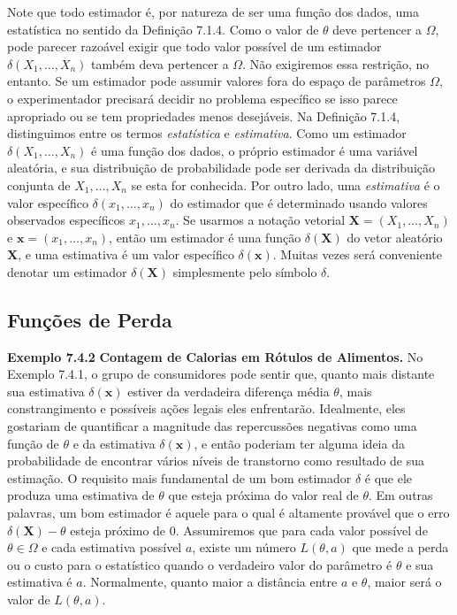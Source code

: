 \vspace{1cm}
Note que todo estimador é, por natureza de ser uma função dos dados, uma estatística no sentido da Definição 7.1.4.
Como o valor de $\theta$ deve pertencer a $\Omega$, pode parecer razoável exigir que todo valor possível de um estimador $\delta(X_1, \dots, X_n)$ também deva pertencer a $\Omega$. Não exigiremos essa restrição, no entanto. Se um estimador pode assumir valores fora do espaço de parâmetros $\Omega$, o experimentador precisará decidir no problema específico se isso parece apropriado ou se tem propriedades menos desejáveis.
Na Definição 7.1.4, distinguimos entre os termos \textit{estatística} e \textit{estimativa}. Como um estimador $\delta(X_1, \dots, X_n)$ é uma função dos dados, o próprio estimador é uma variável aleatória, e sua distribuição de probabilidade pode ser derivada da distribuição conjunta de $X_1, \dots, X_n$ se esta for conhecida. Por outro lado, uma \textit{estimativa} é o valor específico $\delta(x_1, \dots, x_n)$ do estimador que é determinado usando valores observados específicos $x_1, \dots, x_n$. Se usarmos a notação vetorial $\mathbf{X}=(X_1, \dots, X_n)$ e $\mathbf{x}=(x_1, \dots, x_n)$, então um estimador é uma função $\delta(\mathbf{X})$ do vetor aleatório $\mathbf{X}$, e uma estimativa é um valor específico $\delta(\mathbf{x})$. Muitas vezes será conveniente denotar um estimador $\delta(\mathbf{X})$ simplesmente pelo símbolo $\delta$.

\subsection*{Funções de Perda}

\noindent\textbf{Exemplo 7.4.2} \quad \textbf{Contagem de Calorias em Rótulos de Alimentos.} No Exemplo 7.4.1, o grupo de consumidores pode sentir que, quanto mais distante sua estimativa $\delta(\mathbf{x})$ estiver da verdadeira diferença média $\theta$, mais constrangimento e possíveis ações legais eles enfrentarão. Idealmente, eles gostariam de quantificar a magnitude das repercussões negativas como uma função de $\theta$ e da estimativa $\delta(\mathbf{x})$, e então poderiam ter alguma ideia da probabilidade de encontrar vários níveis de transtorno como resultado de sua estimação. O requisito mais fundamental de um bom estimador $\delta$ é que ele produza uma estimativa de $\theta$ que esteja próxima do valor real de $\theta$. Em outras palavras, um bom estimador é aquele para o qual é altamente provável que o erro $\delta(\mathbf{X}) - \theta$ esteja próximo de 0. Assumiremos que para cada valor possível de $\theta \in \Omega$ e cada estimativa possível $a$, existe um número $L(\theta, a)$ que mede a perda ou o custo para o estatístico quando o verdadeiro valor do parâmetro é $\theta$ e sua estimativa é $a$. Normalmente, quanto maior a distância entre $a$ e $\theta$, maior será o valor de $L(\theta, a)$.

